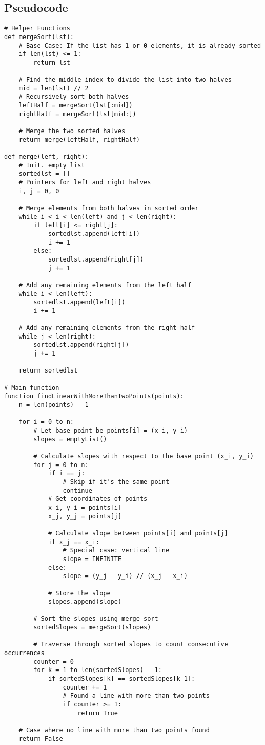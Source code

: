 \documentclass{article}
\begin{document}
\subsection*{Pseudocode}
\begin{verbatim}
# Helper Functions
def mergeSort(lst):
    # Base Case: If the list has 1 or 0 elements, it is already sorted
    if len(lst) <= 1:
        return lst

    # Find the middle index to divide the list into two halves
    mid = len(lst) // 2
    # Recursively sort both halves
    leftHalf = mergeSort(lst[:mid]) 
    rightHalf = mergeSort(lst[mid:])

    # Merge the two sorted halves
    return merge(leftHalf, rightHalf)

def merge(left, right):
    # Init. empty list
    sortedlst = []  
    # Pointers for left and right halves
    i, j = 0, 0 

    # Merge elements from both halves in sorted order
    while i < i < len(left) and j < len(right):
        if left[i] <= right[j]:
            sortedlst.append(left[i])
            i += 1
        else: 
            sortedlst.append(right[j])
            j += 1
            
    # Add any remaining elements from the left half
    while i < len(left):
        sortedlst.append(left[i])
        i += 1

    # Add any remaining elements from the right half
    while j < len(right):
        sortedlst.append(right[j])
        j += 1

    return sortedlst

# Main function           
function findLinearWithMoreThanTwoPoints(points):
    n = len(points) - 1

    for i = 0 to n:
        # Let base point be points[i] = (x_i, y_i)
        slopes = emptyList() 

        # Calculate slopes with respect to the base point (x_i, y_i)
        for j = 0 to n:
            if i == j:  
                # Skip if it's the same point
                continue
            # Get coordinates of points
            x_i, y_i = points[i]
            x_j, y_j = points[j]

            # Calculate slope between points[i] and points[j]
            if x_j == x_i:
                # Special case: vertical line 
                slope = INFINITE
            else:
                slope = (y_j - y_i) // (x_j - x_i)

            # Store the slope
            slopes.append(slope)

        # Sort the slopes using merge sort
        sortedSlopes = mergeSort(slopes)

        # Traverse through sorted slopes to count consecutive occurrences
        counter = 0
        for k = 1 to len(sortedSlopes) - 1:
            if sortedSlopes[k] == sortedSlopes[k-1]:
                counter += 1
                # Found a line with more than two points
                if counter >= 1: 
                    return True

    # Case where no line with more than two points found
    return False
\end{verbatim}
\end{document}
